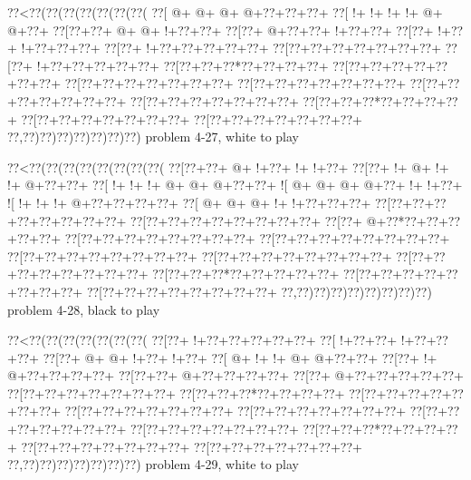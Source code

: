 \vbox{\vbox{\goo
\0??<\0??(\0??(\0??(\0??(\0??(\0??(\0??(
\0??[\- @+\- @+\- @+\- @+\0??+\0??+\0??+
\0??[\- !+\- !+\- !+\- !+\- @+\- @+\0??+
\0??[\0??+\0??+\- @+\- @+\- !+\0??+\0??+
\0??[\0??+\- @+\0??+\0??+\- !+\0??+\0??+
\0??[\0??+\- !+\0??+\- !+\0??+\0??+\0??+
\0??[\0??+\- !+\0??+\0??+\0??+\0??+\0??+
\0??[\0??+\0??+\0??+\0??+\0??+\0??+\0??+
\0??[\0??+\- !+\0??+\0??+\0??+\0??+\0??+
\0??[\0??+\0??+\0??*\0??+\0??+\0??+\0??+
\0??[\0??+\0??+\0??+\0??+\0??+\0??+\0??+
\0??[\0??+\0??+\0??+\0??+\0??+\0??+\0??+
\0??[\0??+\0??+\0??+\0??+\0??+\0??+\0??+
\0??[\0??+\0??+\0??+\0??+\0??+\0??+\0??+
\0??[\0??+\0??+\0??+\0??+\0??+\0??+\0??+
\0??[\0??+\0??+\0??*\0??+\0??+\0??+\0??+
\0??[\0??+\0??+\0??+\0??+\0??+\0??+\0??+
\0??[\0??+\0??+\0??+\0??+\0??+\0??+\0??+
\0??,\0??)\0??)\0??)\0??)\0??)\0??)\0??)
}
\hfil problem 4-27, white to play\hfil\break
}

\vbox{\vbox{\goo
\0??<\0??(\0??(\0??(\0??(\0??(\0??(\0??(\0??(
\0??[\0??+\0??+\- @+\- !+\0??+\- !+\- !+\0??+
\0??[\0??+\- !+\- @+\- !+\- !+\- @+\0??+\0??+
\0??[\- !+\- !+\- !+\- @+\- @+\- @+\0??+\0??+
\- ![\- @+\- @+\- @+\- @+\0??+\- !+\- !+\0??+
\- ![\- !+\- !+\- !+\- @+\0??+\0??+\0??+\0??+
\0??[\- @+\- @+\- @+\- !+\- !+\0??+\0??+\0??+
\0??[\0??+\0??+\0??+\0??+\0??+\0??+\0??+\0??+
\0??[\0??+\0??+\0??+\0??+\0??+\0??+\0??+\0??+
\0??[\0??+\- @+\0??*\0??+\0??+\0??+\0??+\0??+
\0??[\0??+\0??+\0??+\0??+\0??+\0??+\0??+\0??+
\0??[\0??+\0??+\0??+\0??+\0??+\0??+\0??+\0??+
\0??[\0??+\0??+\0??+\0??+\0??+\0??+\0??+\0??+
\0??[\0??+\0??+\0??+\0??+\0??+\0??+\0??+\0??+
\0??[\0??+\0??+\0??+\0??+\0??+\0??+\0??+\0??+
\0??[\0??+\0??+\0??*\0??+\0??+\0??+\0??+\0??+
\0??[\0??+\0??+\0??+\0??+\0??+\0??+\0??+\0??+
\0??[\0??+\0??+\0??+\0??+\0??+\0??+\0??+\0??+
\0??,\0??)\0??)\0??)\0??)\0??)\0??)\0??)\0??)
}
\hfil problem 4-28, black to play\hfil\break
}

\vbox{\vbox{\goo
\0??<\0??(\0??(\0??(\0??(\0??(\0??(\0??(
\0??[\0??+\- !+\0??+\0??+\0??+\0??+\0??+
\0??[\- !+\0??+\0??+\- !+\0??+\0??+\0??+
\0??[\0??+\- @+\- @+\- !+\0??+\- !+\0??+
\0??[\- @+\- !+\- !+\- @+\- @+\0??+\0??+
\0??[\0??+\- !+\- @+\0??+\0??+\0??+\0??+
\0??[\0??+\0??+\- @+\0??+\0??+\0??+\0??+
\0??[\0??+\- @+\0??+\0??+\0??+\0??+\0??+
\0??[\0??+\0??+\0??+\0??+\0??+\0??+\0??+
\0??[\0??+\0??+\0??*\0??+\0??+\0??+\0??+
\0??[\0??+\0??+\0??+\0??+\0??+\0??+\0??+
\0??[\0??+\0??+\0??+\0??+\0??+\0??+\0??+
\0??[\0??+\0??+\0??+\0??+\0??+\0??+\0??+
\0??[\0??+\0??+\0??+\0??+\0??+\0??+\0??+
\0??[\0??+\0??+\0??+\0??+\0??+\0??+\0??+
\0??[\0??+\0??+\0??*\0??+\0??+\0??+\0??+
\0??[\0??+\0??+\0??+\0??+\0??+\0??+\0??+
\0??[\0??+\0??+\0??+\0??+\0??+\0??+\0??+
\0??,\0??)\0??)\0??)\0??)\0??)\0??)\0??)
}
\hfil problem 4-29, white to play\hfil\break
}

